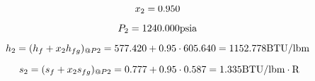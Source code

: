 \begin{equation}
x_{ 2} =    0.950\textnormal{                          }
\end{equation}

\begin{equation}
P_{ 2} = 1240.000\textnormal{psia                      }
\end{equation}

\begin{equation}
  h_{ 2} = (h_{f} + x_{ 2}h_{fg})_{@P 2} =  577.420 + 0.95\cdot 605.640 = 1152.778
\textnormal{BTU/lbm                   }
\end{equation}

\begin{equation}
  s_{ 2} = (s_{f} + x_{ 2}s_{fg})_{@P 2} =    0.777 + 0.95\cdot   0.587 =    1.335
\textnormal{BTU/lbm}\cdot\textnormal{R}
\end{equation}

